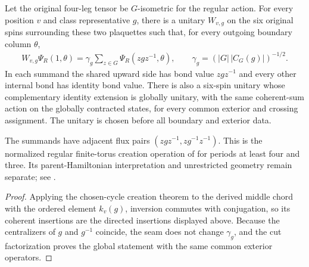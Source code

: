 \begin{lemma}%
    \label{thm:peps_torus_translated_flux_creation}
    \leanok
    Let the original four-leg tensor be $G$-isometric for the regular
    action. For every position $v$ and class representative $g$, there is
    a unitary $W_{v,g}$ on the six original spins surrounding these two
    plaquettes such that, for every outgoing boundary column $\theta$,
    \begin{align}
        W_{v,g}\Psi_R(1,\theta)
        =\gamma_g\sum_{z\in G}\Psi_R(zgz^{-1},\theta),
        \qquad \gamma_g=(|G|\,|C_G(g)|)^{-1/2}.
    \end{align}
    In each summand the shared upward side has bond value $zgz^{-1}$ and
    every other internal bond has identity bond value. There is also a six-spin
    unitary whose complementary identity extension is globally unitary, with
    the same coherent-sum action on the globally contracted states,
    for every common exterior and crossing assignment. The unitary is
    chosen before all boundary and exterior data.

    The summands have adjacent flux pairs
    $(zgz^{-1},zg^{-1}z^{-1})$. This is the normalized regular finite-torus
    creation operation of \cite[Theorem~6.17]{Schuch2010PEPS} for periods
    at least four and three. Its parent-Hamiltonian interpretation and
    unrestricted geometry remain separate; see
    \cite{gap:rmp_peps_quantum_double_g_isometry}.
\end{lemma}
\begin{proof}\leanok
    Applying the chosen-cycle creation theorem to the derived middle
    chord with the ordered element $k_v(g)$, inversion commutes with
    conjugation, so its coherent insertions are the directed insertions
    displayed above. Because the centralizers of $g$ and $g^{-1}$ coincide,
    the seam does not change $\gamma_g$, and the cut factorization proves
    the global statement with the same common exterior operators.
\end{proof}
